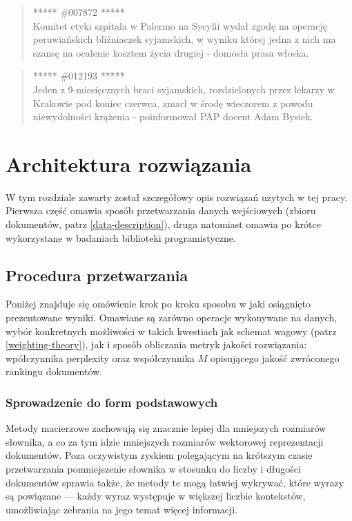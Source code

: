 \documentclass[11pt,a4paper]{article}
\begin{document}
\begin{quote} ***** \#007872 *****\\ Komitet etyki szpitala w Palermo na Sycylii
wydał zgodę na operację peruwiańskich bliźniaczek syjamskich, w wyniku której
jedna z nich ma szansę na ocalenie kosztem życia drugiej - doniosła prasa
włoska.  \end{quote}

\begin{quote} ***** \#012193 *****\\ Jeden z 9-miesięcznych braci syjamskich,
rozdzielonych przez lekarzy w Krakowie pod koniec czerwca, zmarł w środę
wieczorem z powodu niewydolności krążenia - poinformował PAP docent Adam
Bysiek.  \end{quote}

\pagebreak

\section{Architektura rozwiązania}
\label{sec:solution}

W tym rozdziale zawarty został szczegółowy opis rozwiązań użytych w tej pracy.
Pierwsza część omawia sposób przetwarzania danych wejściowych (zbioru
dokumentów, patrz \ref{data-description}), druga natomiast omawia po krótce
wykorzystane w badaniach biblioteki programistyczne.

\subsection{Procedura przetwarzania}

Poniżej znajduje się omówienie krok po kroku sposobu w jaki osiągnięto
prezentowane wyniki. Omawiane są zarówno operacje wykonywane na danych, wybór
konkretnych możliwości w takich kwestiach jak schemat wagowy (patrz
\ref{weighting-theory}), jak i sposób obliczania metryk jakości rozwiązania:
wpółczynnika perplexity oraz współczynnika $M$ opisującego
jakość zwróconego rankingu dokumentów.

\subsubsection{Sprowadzenie do form podstawowych}

Metody macierzowe zachowują się znacznie lepiej dla mniejszych rozmiarów
słownika, a co za tym idzie mniejszych rozmiarów wektorowej reprezentacji
dokumentów. Poza oczywistym zyskiem polegającym na krótszym czasie
przetwarzania pomniejszenie słownika w stosunku do liczby i długości
dokumentów sprawia także, że metody te mogą łatwiej wykrywać, które wyrazy są
powiązane --- każdy wyraz występuje w większej liczbie kontekstów, umożliwiając
zebrania na jego temat więcej informacji.
\end{document}
